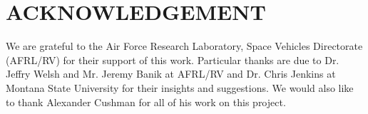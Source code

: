 \documentclass[11pt,letterpaper]{article}%
\begin{document}
\section*{ACKNOWLEDGEMENT}

We are grateful to the Air Force Research Laboratory, Space
Vehicles Directorate (AFRL/RV) for their support of this work.
Particular thanks are due to Dr. Jeffry Welsh and Mr. Jeremy Banik
at AFRL/RV and Dr. Chris Jenkins at Montana State University for
their insights and suggestions. We would also like to thank Alexander Cushman for all of his work on this project.




\end{document}
